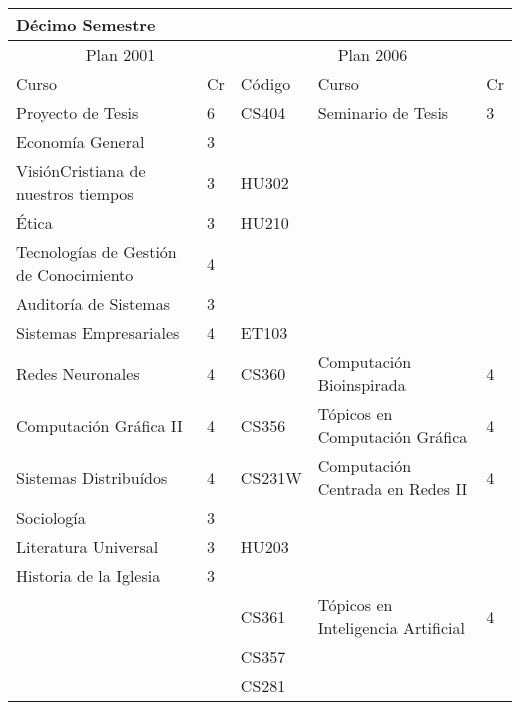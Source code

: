 \begin{center}
\begin{tabularx}{0.95\textwidth}{|p{4cm}|p{1cm}||p{2cm}|X|p{1cm}|}\hline
\multicolumn{5}{|l|}{\textbf{Décimo Semestre}} \\ \hline
\multicolumn{2}{|c|}{Plan 2001} & \multicolumn{3}{|c|}{Plan 2006} \\ \hline
Curso & Cr & Código & Curso & Cr \\ \hline
Proyecto de Tesis & 6 & CS404 & Seminario de Tesis & 3 \\ \hline
Economía General & 3 &  &  & \\ \hline
VisiónCristiana de nuestros tiempos & 3 & HU302 &  & \\ \hline
Ética & 3 & HU210 &  & \\ \hline
Tecnologías de Gestión de Conocimiento & 4 &  &  & \\ \hline
Auditoría de Sistemas & 3 &  &  & \\ \hline
Sistemas Empresariales & 4 & ET103 &  & \\ \hline
Redes Neuronales & 4 & CS360 & Computación Bioinspirada & 4 \\ \hline
Computación Gráfica II & 4 & CS356 & Tópicos en Computación Gráfica & 4 \\ \hline
Sistemas Distribuídos & 4 & CS231W & Computación Centrada en Redes II & 4 \\ \hline
Sociología & 3 &  &  & \\ \hline
Literatura Universal & 3 & HU203 &  & \\ \hline
Historia de la Iglesia & 3 &  &  & \\ \hline
 &  & CS361 & Tópicos en Inteligencia Artificial & 4 \\ \hline
 &  & CS357 &  & \\ \hline
 &  & CS281 &  & \\ \hline
\end{tabularx}
\end{center}

